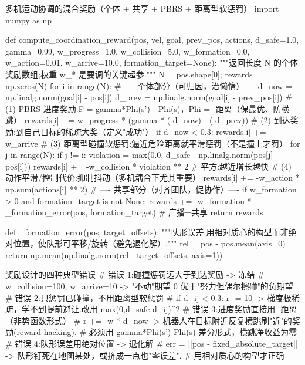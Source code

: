 \begin{codebox}[Python]{多机运动协调的混合奖励（个体 + 共享 + PBRS + 距离型软惩罚）}
import numpy as np

def compute_coordination_reward(pos, vel, goal, prev_pos, actions,
                                d_safe=1.0, gamma=0.99,
                                w_progress=1.0, w_collision=5.0, w_formation=0.0,
                                w_action=0.01, w_arrive=10.0, formation_target=None):
    """返回长度 N 的个体奖励数组;权重 w_* 是要调的关键超参."""
    N = pos.shape[0]; rewards = np.zeros(N)
    for i in range(N):
        # ---- 个体部分（可归因，治懒惰）----
        d_now  = np.linalg.norm(goal[i] - pos[i])
        d_prev = np.linalg.norm(goal[i] - prev_pos[i])
        # (1) PBRS 进度奖励:F = gamma*Phi(s') - Phi(s)，Phi = -距离（保最优、防横跳）
        rewards[i] += w_progress * (gamma * (-d_now) - (-d_prev))
        # (2) 到达奖励:到自己目标的稀疏大奖（定义"成功"）
        if d_now < 0.3:
            rewards[i] += w_arrive
        # (3) 距离型碰撞软惩罚:逼近危险距离就平滑惩罚（不是撞上才罚）
        for j in range(N):
            if j != i:
                violation = max(0.0, d_safe - np.linalg.norm(pos[j] - pos[i]))
                rewards[i] += -w_collision * violation ** 2   # 平方:越近增长越快
        # (4) 动作平滑/控制代价:抑制抖动（多机耦合下尤其重要）
        rewards[i] += -w_action * np.sum(actions[i] ** 2)
    # ---- 共享部分（对齐团队，促协作）----
    if w_formation > 0 and formation_target is not None:
        rewards += -w_formation * _formation_error(pos, formation_target)  # 广播=共享
    return rewards

def _formation_error(pos, target_offsets):
    """队形误差:用相对质心的构型而非绝对位置，使队形可平移/旋转（避免退化解）."""
    rel = pos - pos.mean(axis=0)
    return np.mean(np.linalg.norm(rel - target_offsets, axis=1))
\end{codebox}

\begin{codebox}[Python]{奖励设计的四种典型错误}
# 错误 1:碰撞惩罚远大于到达奖励 -> 冻结
#   w_collision=100, w_arrive=10 -> "不动"期望 0 优于"努力但偶尔擦碰"的负期望
# 错误 2:只惩罚已碰撞，不用距离型软惩罚
#   if d_ij < 0.3: r -= 10  -> 梯度极稀疏，学不到提前避让.改用 max(0,d_safe-d_ij)^2
# 错误 3:进度奖励直接用 -距离（非势函数形式）
#   r += -w * d_now  -> 机器人在目标附近反复横跳刷"近"的奖励(reward hacking).
#                       必须用 gamma*Phi(s')-Phi(s) 差分形式，横跳净收益为零
# 错误 4:队形误差用绝对位置 -> 退化解
#   err = ||pos - fixed_absolute_target||  -> 队形钉死在地图某处，或挤成一点也"零误差".
#                                              用相对质心的构型才正确
\end{codebox}

